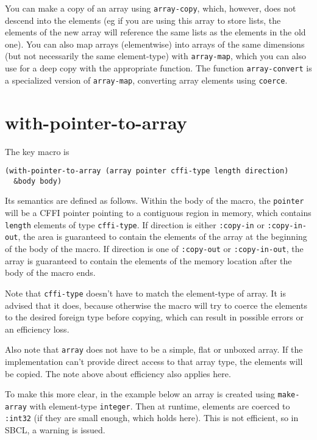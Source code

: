 \documentclass[12pt,a4paper,dvipdfm]{article}
\begin{document}
You can make a copy of an array using \lstinline!array-copy!, which,
however, does not descend into the elements (eg if you are using this
array to store lists, the elements of the new array will reference the
same lists as the elements in the old one).  You can also map arrays
(elementwise) into arrays of the same dimensions (but not necessarily
the same element-type) with \lstinline!array-map!, which you can also
use for a deep copy with the appropriate function.  The function
\lstinline!array-convert! is a specialized version of
\lstinline!array-map!, converting array elements using
\lstinline!coerce!.


\section{with-pointer-to-array}
\label{sec:with-pointer-array}

The key macro is 
\begin{lstlisting}
(with-pointer-to-array (array pointer cffi-type length direction)
  &body body)
\end{lstlisting}

Its semantics are defined as follows.  Within the body of the macro,
the \lstinline!pointer! will be a CFFI pointer pointing to a
contiguous region in memory, which contains \lstinline!length!
elements of type \lstinline!cffi-type!.  If direction is either
\lstinline!:copy-in! or \lstinline!:copy-in-out!, the area is
guaranteed to contain the elements of the array at the beginning of
the body of the macro.  If direction is one of \lstinline!:copy-out!
or \lstinline!:copy-in-out!, the array is guaranteed to contain the
elements of the memory location after the body of the macro ends.

Note that \lstinline!cffi-type! doesn't have to match the element-type
of array.  It is advised that it does, because otherwise the macro
will try to coerce the elements to the desired foreign type before
copying, which can result in possible errors or an efficiency loss.

Also note that \lstinline!array! does not have to be a simple, flat or
unboxed array.  If the implementation can't provide direct access to
that array type, the elements will be copied.  The note above about
efficiency also applies here.

To make this more clear, in the example below an array is created
using \lstinline!make-array! with element-type \lstinline!integer!.
Then at runtime, elements are coerced to \lstinline!:int32! (if they
are small enough, which holds here).  This is not efficient, so in
SBCL, a warning is issued.
\end{document}
